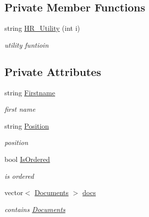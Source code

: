 \subsection*{Private Member Functions}
\begin{DoxyCompactItemize}
\item 
\mbox{\label{class_h_r_a55cb339b18d5eac3fb3a7a9a260d5f98}} 
string \hyperlink{class_h_r_a55cb339b18d5eac3fb3a7a9a260d5f98}{H\+R\+\_\+\+Utility} (int i)
\begin{DoxyCompactList}\small\item\em utility funtioin \end{DoxyCompactList}\end{DoxyCompactItemize}
\subsection*{Private Attributes}
\begin{DoxyCompactItemize}
\item 
\mbox{\label{class_h_r_a9d6a324bfb9253c23e71eefeb8bacde2}} 
string \hyperlink{class_h_r_a9d6a324bfb9253c23e71eefeb8bacde2}{Firstname}
\begin{DoxyCompactList}\small\item\em first name \end{DoxyCompactList}\item 
\mbox{\label{class_h_r_aa19b0e239c73c6f5ab18801f102f1c2e}} 
string \hyperlink{class_h_r_aa19b0e239c73c6f5ab18801f102f1c2e}{Position}
\begin{DoxyCompactList}\small\item\em position \end{DoxyCompactList}\item 
\mbox{\label{class_h_r_a9afdecc986cdc4e15a8d73b30286dbdc}} 
bool \hyperlink{class_h_r_a9afdecc986cdc4e15a8d73b30286dbdc}{Is\+Ordered}
\begin{DoxyCompactList}\small\item\em is ordered \end{DoxyCompactList}\item 
\mbox{\label{class_h_r_a3dca2f7facc0c01c245af8a1a1994f37}} 
vector$<$ \hyperlink{class_documents}{Documents} $>$ \hyperlink{class_h_r_a3dca2f7facc0c01c245af8a1a1994f37}{docs}
\begin{DoxyCompactList}\small\item\em contains \hyperlink{class_documents}{Documents} \end{DoxyCompactList}\end{DoxyCompactItemize}


